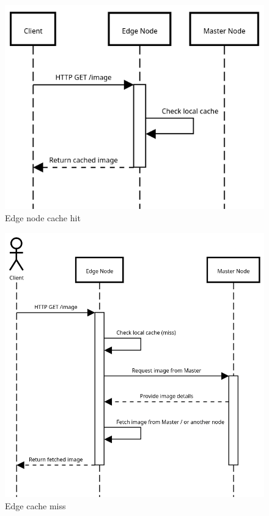 \documentclass{article}
\begin{document}
  \begin{figure}
    \centering
    \includegraphics[width=1.0\textwidth]{imgs/cache_hit}
    \caption{Edge node cache hit}
    \label{fig:Edge Node - cache hit scenario}
  \end{figure}




  \begin{figure}
    \centering
    \includegraphics[width=1.0\textwidth]{imgs/cache_miss}
    \caption{Edge cache miss}
    \label{fig:Edge Node - cache miss scenario}
  \end{figure}
\end{document}
